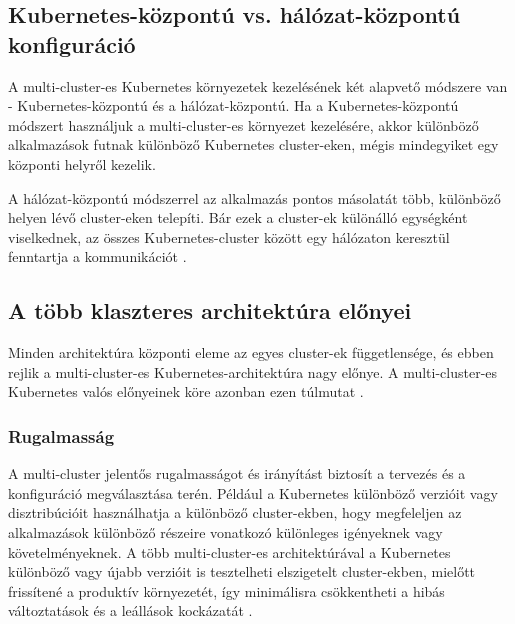 \subsection{Kubernetes-központú vs. hálózat-központú konfiguráció}
A multi-cluster-es Kubernetes környezetek kezelésének két alapvető módszere van - Kubernetes-központú és a hálózat-központú.
Ha a Kubernetes-központú módszert használjuk a multi-cluster-es környezet kezelésére, akkor különböző alkalmazások futnak különböző Kubernetes cluster-eken, mégis mindegyiket egy központi helyről kezelik.

A hálózat-központú módszerrel az alkalmazás pontos másolatát több, különböző helyen lévő cluster-eken telepíti.
Bár ezek a cluster-ek különálló egységként viselkednek, az összes Kubernetes-cluster között egy hálózaton keresztül fenntartja a kommunikációt \cite{multicluster}.

\subsection{A több klaszteres architektúra előnyei}
Minden architektúra központi eleme az egyes cluster-ek függetlensége, és ebben rejlik a multi-cluster-es Kubernetes-architektúra nagy előnye.
A multi-cluster-es Kubernetes valós előnyeinek köre azonban ezen túlmutat \cite{multicluster}.

\subsubsection*{Rugalmasság}
A multi-cluster jelentős rugalmasságot és irányítást biztosít a tervezés és a konfiguráció megválasztása terén.
Például a Kubernetes különböző verzióit vagy disztribúcióit használhatja a különböző cluster-ekben, hogy megfeleljen az alkalmazások különböző részeire vonatkozó különleges igényeknek vagy követelményeknek.
A több multi-cluster-es architektúrával a Kubernetes különböző vagy újabb verzióit is tesztelheti elszigetelt cluster-ekben, mielőtt frissítené a produktív környezetét, így minimálisra csökkentheti a hibás változtatások és a leállások kockázatát \cite{multicluster}.

